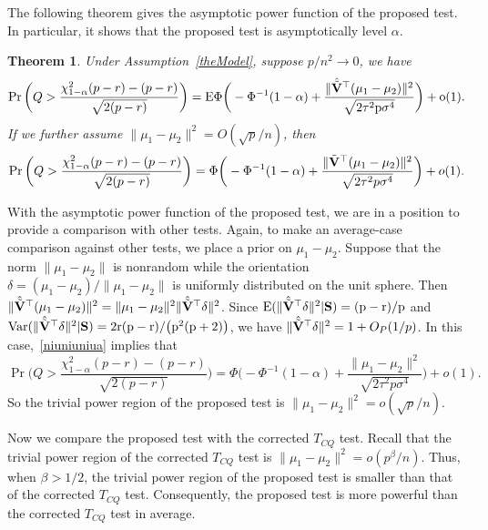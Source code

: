 \documentclass[times,sort&compress,3p]{elsarticle}
\newcommand{\myE}{\rm E}
\newcommand{\myVar}{\rm Var}
\theoremstyle{plain}
\newtheorem{theorem}{\quad\quad Theorem}
\theoremstyle{definition}
\theoremstyle{remark}
\begin{document}
The following theorem gives the asymptotic power function of the proposed test.
 In particular, it shows that the proposed test is asymptotically level $\alpha$.
\begin{theorem}\label{testPowerh}
    Under Assumption~\ref{theModel},
suppose $p/n^2\to 0$, we have
        \begin{equation}\label{niuniuniua}
        \Pr\bigg(Q>\frac{\chi^2_{1-\alpha}(p-r)-(p-r)}{\sqrt{2(p-r)}}\bigg)=
            \myE\Phi\bigg(-\Phi^{-1}(1-\alpha)+\frac{\|\hat{\tilde{\BV}}^\top (\mu_1-\mu_2)\|^2}{\sqrt{2\tau^2 p\sigma^4}}\bigg)+o(1)
            .
        \end{equation}
     If we further assume $\|\mu_1-\mu_2\|^2=O({\sqrt{p}}/{n})$, then
    \begin{equation}\label{niuniuniub}
        \Pr\bigg(Q>\frac{\chi^2_{1-\alpha}(p-r)-(p-r)}{\sqrt{2(p-r)}}\bigg)=\Phi\bigg(-\Phi^{-1}(1-\alpha)+\frac{\|\tilde{\mathbf{V}}^\top (\mu_1-\mu_2)\|^2}{\sqrt{2\tau^2 p\sigma^4}}\bigg)+o(1).
    \end{equation}
\end{theorem}

With the asymptotic power function of the proposed test, we are in a position to provide a comparison with other tests.
Again, to make an average-case comparison against other tests, we place a prior on $\mu_1-\mu_2$.
Suppose that the norm $\|\mu_1-\mu_2\|$ is nonrandom while the orientation $\delta=(\mu_1-\mu_2)/\|\mu_1-\mu_2\|$ is uniformly distributed on the unit sphere.
Then $\|\hat{\tilde{\mathbf{V}}}^\top (\mu_1-\mu_2)\|^2=\|\mu_1-\mu_2\|^2 \|\hat{\tilde{\mathbf{V}}}^\top \delta\|^2$.
Since $\myE (\|\hat{\tilde{\BV}}^\top \delta\|^2|\BS)=(p-r)/p$ and $\myVar (\|\hat{\tilde{\BV}}^\top \delta\|^2|\BS) = 2r(p-r)/\big(p^2(p+2)\big)$, we have $\|\hat{\tilde{\mathbf{V}}}^\top \delta\|^2=1+O_P(1/p)$.
In this case,~\eqref{niuniuniua} implies that
    \begin{equation*}
        \Pr\bigg(Q>\frac{\chi^2_{1-\alpha}(p-r)-(p-r)}{\sqrt{2(p-r)}}\bigg)=
        \Phi\bigg(-\Phi^{-1}(1-\alpha)+\frac{\|\mu_1-\mu_2\|^2}{\sqrt{2\tau^2 p\sigma^4}}\bigg)+o(1).
    \end{equation*}
So the trivial power region of the proposed test is $\|\mu_1-\mu_2\|^2= o(\sqrt{p}/n)$.

Now we compare the proposed test with the corrected $T_{CQ}$ test.
Recall that the trivial power region of the corrected $T_{CQ}$ test is $\|\mu_1-\mu_2\|^2=o( p^{\beta}/n)$.
 Thus, when $\beta>1/2$, the trivial power region of the proposed test is smaller than that of the corrected $T_{CQ}$ test.
Consequently, the proposed test is more powerful than the corrected $T_{CQ}$ test in average.
\end{document}
